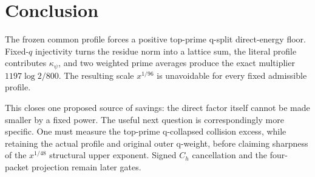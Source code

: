 \section{Conclusion}
\label{sec:conclusion}

The frozen common profile forces a positive top-prime q-split direct-energy
floor.  Fixed-$q$ injectivity turns the residue norm into a lattice sum, the
literal profile contributes $\kappa_\psi$, and two weighted prime averages
produce the exact multiplier $1197\log2/800$.  The resulting scale
$x^{1/96}$ is unavoidable for every fixed admissible profile.

This closes one proposed source of savings: the direct factor itself cannot be
made smaller by a fixed power.  The useful next question is correspondingly
more specific.  One must measure the top-prime q-collapsed collision excess,
while retaining the actual profile and original outer q-weight, before
claiming sharpness of the $x^{1/48}$ structural upper exponent.  Signed
$C_h$ cancellation and the four-packet projection remain later gates.
